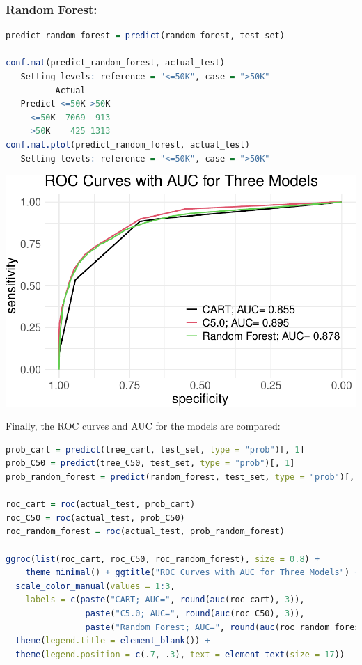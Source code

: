\documentclass[
]{book}
\theoremstyle{definition}
\theoremstyle{definition}
\theoremstyle{definition}
\theoremstyle{definition}
\theoremstyle{remark}
\begin{document}
\subsubsection*{Random Forest:}\label{random-forest-1}

\begin{lstlisting}[language=R]
predict_random_forest = predict(random_forest, test_set)

conf.mat(predict_random_forest, actual_test)
   Setting levels: reference = "<=50K", case = ">50K"
          Actual
   Predict <=50K >50K
     <=50K  7069  913
     >50K    425 1313
conf.mat.plot(predict_random_forest, actual_test)
   Setting levels: reference = "<=50K", case = ">50K"
\end{lstlisting}

\begin{center}\includegraphics[width=0.3\linewidth]{tree_files/figure-latex/unnamed-chunk-13-1} \end{center}

Finally, the ROC curves and AUC for the models are compared:

\begin{lstlisting}[language=R]
prob_cart = predict(tree_cart, test_set, type = "prob")[, 1]
prob_C50 = predict(tree_C50, test_set, type = "prob")[, 1]
prob_random_forest = predict(random_forest, test_set, type = "prob")[, 1]

roc_cart = roc(actual_test, prob_cart)
roc_C50 = roc(actual_test, prob_C50)
roc_random_forest = roc(actual_test, prob_random_forest)

ggroc(list(roc_cart, roc_C50, roc_random_forest), size = 0.8) + 
    theme_minimal() + ggtitle("ROC Curves with AUC for Three Models") +
  scale_color_manual(values = 1:3, 
    labels = c(paste("CART; AUC=", round(auc(roc_cart), 3)), 
                paste("C5.0; AUC=", round(auc(roc_C50), 3)), 
                paste("Random Forest; AUC=", round(auc(roc_random_forest), 3)))) +
  theme(legend.title = element_blank()) +
  theme(legend.position = c(.7, .3), text = element_text(size = 17))
\end{lstlisting}
\end{document}
